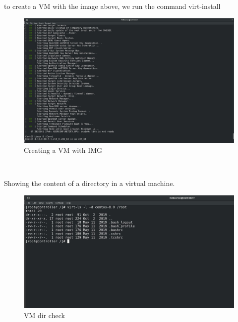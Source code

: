 \begin{spacing}{1.2}
\par to create a VM with the image above, we run the command virt-install
\\
\begin{figure}[!htb] 
\begin{center} 
\includegraphics[width=1\linewidth]{Cloud/Add Virtual Machine Images/KVM Install VM Management Tools/Creating a VM with IMG} 
\end{center} 
\caption{Creating a VM with IMG} 
\end{figure}  \FloatBarrier
\\

\par 
Showing the content of a directory in a virtual machine.
\\
\begin{figure}[!htb] 
\begin{center} 
\includegraphics[width=1\linewidth]{Cloud/Add Virtual Machine Images/KVM Install VM Management Tools/VM dir check} 
\end{center} 
\caption{VM dir check} 
\end{figure}  \FloatBarrier
\\


\end{spacing}
